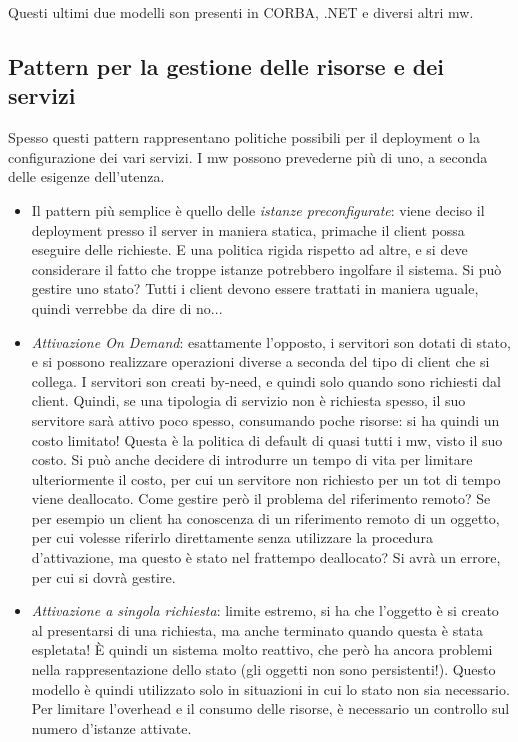 Questi ultimi due modelli son presenti in CORBA, .NET e diversi altri mw.

\subsection{Pattern per la gestione delle risorse e dei servizi}
Spesso questi pattern rappresentano politiche possibili per il deployment o la configurazione dei vari servizi. I mw
possono prevederne più di uno, a seconda delle esigenze dell'utenza.
\begin{itemize}
 \item Il pattern più semplice è quello delle \textit{istanze preconfigurate}: viene deciso il deployment presso il
 server in maniera statica, primache il client possa eseguire delle richieste. E una politica rigida rispetto ad altre,
 e si deve considerare il fatto che troppe istanze potrebbero ingolfare il sistema. Si può gestire uno stato? Tutti i
 client devono essere trattati in maniera uguale, quindi verrebbe da dire di no...
 \item \textit{Attivazione On Demand}: esattamente l'opposto, i servitori son dotati di stato, e si possono realizzare
 operazioni diverse a seconda del tipo di client che si collega. I servitori son creati by-need, e quindi solo quando
 sono richiesti dal client. Quindi, se una tipologia di servizio non è richiesta spesso, il suo servitore sarà attivo
 poco spesso, consumando poche risorse: si ha quindi un costo limitato! Questa è la politica di default di quasi tutti
 i mw, visto il suo costo. 
 Si può anche decidere di introdurre un tempo di vita per limitare ulteriormente il costo, per cui un servitore non
 richiesto per un tot di tempo viene deallocato.
 Come gestire però il problema del riferimento remoto? Se per esempio un client ha conoscenza di un riferimento remoto 
 di un oggetto, per cui volesse riferirlo direttamente senza utilizzare la procedura d'attivazione, ma questo è stato 
 nel frattempo deallocato? Si avrà un errore, per cui si dovrà gestire.
 \item \textit{Attivazione a singola richiesta}: limite estremo, si ha che l'oggetto è si creato al presentarsi di una
 richiesta, ma anche terminato quando questa è stata espletata! È quindi un sistema molto reattivo, che però ha ancora
 problemi nella rappresentazione dello stato (gli oggetti non sono persistenti!). Questo modello è quindi utilizzato
 solo in situazioni in cui lo stato non sia necessario. Per limitare l'overhead e il consumo delle risorse, è 
 necessario un controllo sul numero d'istanze attivate.

\end{itemize}
